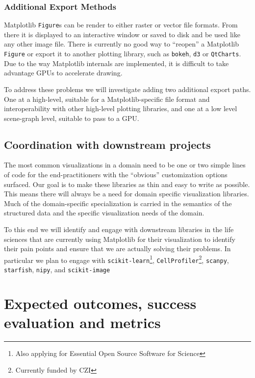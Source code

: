 \documentclass[11pt]{article}  %
\begin{document}
\subsubsection{Additional Export Methods}

Matplotlib \texttt{Figure}s can be render to either raster or vector
file formats.  From there it is displayed to an interactive window or
saved to disk and be used like any other image file.  There is
currently no good way to ``reopen'' a Matplotlib \texttt{Figure} or
export it to another plotting library, such as \texttt{bokeh},
\texttt{d3} or \texttt{QtCharts}.  Due to the way Matplotlib
internals are implemented, it is difficult to take advantage GPUs to
accelerate drawing.

To address these problems we will investigate adding two additional
export paths.  One at a high-level, suitable for a Matplotlib-specific
file format and interoperability with other high-level plotting
libraries, and one at a low level scene-graph level, suitable to pass
to a GPU.


\subsection{Coordination with downstream projects}


The most common visualizations in a domain need to be one or two
simple lines of code for the end-practitioners with the ``obvious''
customization options surfaced.  Our goal is to make these libraries
as thin and easy to write as possible.  This means there will always
be a need for domain specific visualization libraries.  Much of the
domain-specific specialization is carried in the semantics of the
structured data and the specific visualization needs of the domain.


To this end we will identify and engage with downstream libraries in
the life sciences that are currently using Matplotlib for their
visualization to identify their pain points and ensure that we are
actually solving their problems.  In particular we plan to engage with
\texttt{scikit-learn}\footnote{Also applying for Essential Open Source
Software for Science}, \texttt{CellProfiler}\footnote{Currently funded
by CZI\label{f:czi}}, \texttt{scanpy},
\texttt{starfish}, \texttt{nipy}, and
\texttt{scikit-image}


\section{Expected outcomes, success evaluation and metrics}
\end{document}
